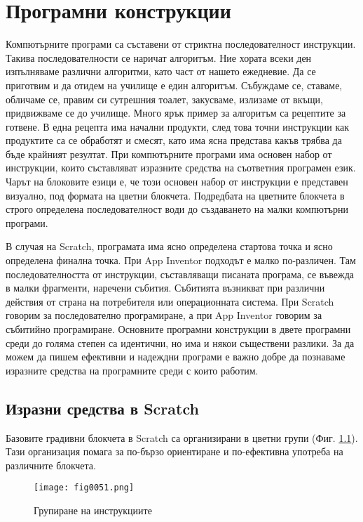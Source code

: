 ﻿\chapter{Програмни конструкции}

Компютърните програми са съставени от стриктна последователност инструкции. Такива последователности се наричат алгоритъм. Ние хората всеки ден изпълняваме различни алгоритми, като част от нашето ежедневие. Да се приготвим и да отидем на училище е един алгоритъм. Събуждаме се, ставаме, обличаме се, правим си сутрешния тоалет, закусваме, излизаме от вкъщи, придвижваме се до училище. Много ярък пример за алгоритъм са рецептите за готвене. В една рецепта има начални продукти, след това точни инструкции как продуктите са се обработят и смесят, като има ясна представа какъв трябва да бъде крайният резултат. При компютърните програми има основен набор от инструкции, които съставляват изразните средства на съответния програмен език. Чарът на блоковите езици е, че този основен набор от инструкции е представен визуално, под формата на цветни блокчета. Подредбата на цветните блокчета в строго определена последователност води до създаването на малки компютърни програми. 

В случая на Scratch, програмата има ясно определена стартова точка и ясно определена финална точка. При App Inventor подходът е малко по-различен. Там последователността от инструкции, съставляващи писаната програма, се въвежда в малки фрагменти, наречени събития. Събитията възникват при различни действия от страна на потребителя или операционната система. При Scratch говорим за последователно програмиране, а при App Inventor говорим за събитийно програмиране. Основните програмни конструкции в двете програмни среди до голяма степен са идентични, но има и някои съществени разлики. За да можем да пишем ефективни и надеждни програми е важно добре да познаваме изразните средства на програмните среди с които работим. 

\section{Изразни средства в Scratch}

Базовите градивни блокчета в Scratch са организирани в цветни групи (Фиг. \ref{fig0051}). Тази организация помага за по-бързо ориентиране и по-ефективна употреба на различните блокчета. 

\begin{figure}[H]
  \centering
  \texttt{[image: fig0051.png]}
  \caption{Групиране на инструкциите}
\label{fig0051}
\end{figure}

